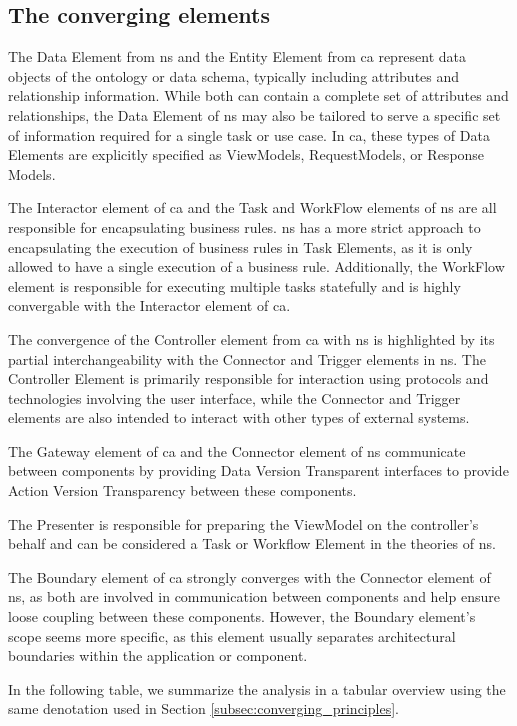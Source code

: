 \subsection{The converging elements}

The Data Element from \gls{ns} and the Entity Element from \gls{ca} represent data objects
of the ontology or data schema, typically including attributes and relationship
information. While both can contain a complete set of attributes and relationships, the
Data Element of \gls{ns} may also be tailored to serve a specific set of information
required for a single task or use case. In \gls{ca}, these types of Data Elements are
explicitly specified as ViewModels, RequestModels, or Response Models.

The Interactor element of \gls{ca} and the Task and WorkFlow elements of \gls{ns} are all
responsible for encapsulating business rules. \gls{ns} has a more strict approach to
encapsulating the execution of business rules in Task Elements, as it is only allowed to
have a single execution of a business rule. Additionally, the WorkFlow element is
responsible for executing multiple tasks statefully and is highly convergable with the
Interactor element of \gls{ca}.

The convergence of the Controller element from \gls{ca} with \gls{ns} is highlighted by
its partial interchangeability with the Connector and Trigger elements in \gls{ns}. The
Controller Element is primarily responsible for interaction using protocols and
technologies involving the user interface, while the Connector and Trigger elements are
also intended to interact with other types of external systems.
 
The Gateway element of \gls{ca} and the Connector element of \gls{ns} communicate between
components by providing Data Version Transparent interfaces to provide Action Version
Transparency between these components.

The Presenter is responsible for preparing the ViewModel on the controller's behalf and
can be considered a Task or Workflow Element in the theories of \gls{ns}.

The Boundary element of \gls{ca} strongly converges with the Connector element of
\gls{ns}, as both are involved in communication between components and help ensure loose
coupling between these components. However, the Boundary element's scope seems more
specific, as this element usually separates architectural boundaries within the
application or component.

In the following table, we summarize the analysis in a tabular overview using the same
denotation used in Section \ref{subsec:converging_principles}.

